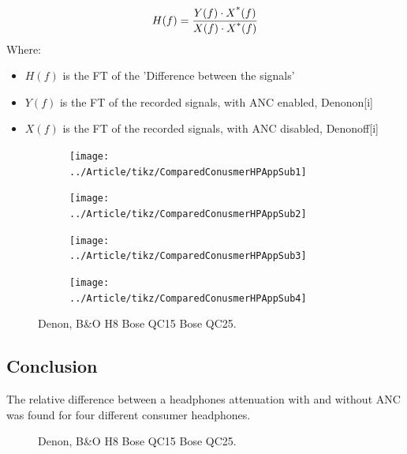 \begin{equation}\label{FrequencyResponseEq2}
H(f) = \frac{Y(f) \cdot X\textsuperscript{*}(f)}{X(f) \cdot X\textsuperscript{*}(f)}
\end{equation}
Where:
\begin{itemize}
	\item $H(f)$ is the FT of the 'Difference between the signals'
	\item $Y(f)$ is the FT of the recorded signals, with ANC enabled,  Denonon[i]
	\item $X(f)$ is the FT of the recorded signals, with ANC disabled, Denonoff[i]
\end{itemize}

\begin{figure}[H]
	\centering
	\begin{subfigure}[b]{.48\textwidth}
	\centering
	\texttt{[image: ../Article/tikz/ComparedConusmerHPAppSub1]}
	\end{subfigure}
	\begin{subfigure}[b]{.48\textwidth}
		\centering
	\texttt{[image: ../Article/tikz/ComparedConusmerHPAppSub2]}
	\end{subfigure}
	\begin{subfigure}[b]{.48\textwidth}
	\centering
	\texttt{[image: ../Article/tikz/ComparedConusmerHPAppSub3]}
	\end{subfigure}
	\begin{subfigure}[b]{.48\textwidth}
	\centering
	\texttt{[image: ../Article/tikz/ComparedConusmerHPAppSub4]}
	\end{subfigure}
\end{figure}


\begin{figure}[H]
	\centering
	
	\caption{Denon, B\&O H8 Bose QC15 Bose QC25.}
	\label{fig:OtherBrandsTestCompare}
\end{figure}

\subsection{Conclusion}
The relative difference between a headphones attenuation with and without ANC was found for four different consumer headphones.


\begin{figure}[H]
	\centering
	
	\caption{Denon, B\&O H8 Bose QC15 Bose QC25.}
	\label{fig:OtherBrandsTestCompare}
\end{figure}



